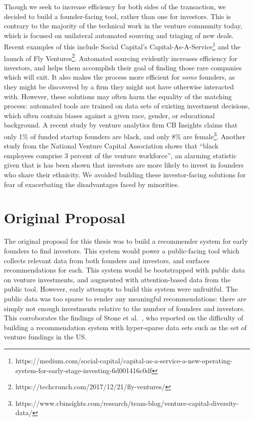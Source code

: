 Though we seek to increase efficiency for both sides of the transaction, we decided to build a founder-facing tool, rather than one for investors. This is contrary to the majority of the technical work in the venture community today, which is focused on unilateral automated sourcing and triaging of new deals. Recent examples of this include Social Capital's Capital-As-A-Service\footnote{https://medium.com/social-capital/capital-as-a-service-a-new-operating-system-for-early-stage-investing-6d001416c0df} and the launch of Fly Ventures\footnote{https://techcrunch.com/2017/12/21/fly-ventures/}. Automated sourcing evidently increases efficiency for investors, and helps them accomplish their goal of finding those rare companies which will exit. It also makes the process more efficient for \textit{some} founders, as they might be discovered by a firm they might not have otherwise interacted with. However, these solutions may often harm the equality of the matching process: automated tools are trained on data sets of existing investment decisions, which often contain biases against a given race, gender, or educational background. A recent study by venture analytics firm CB Insights claims that only 1\% of funded startup founders are black, and only 8\% are female\footnote{https://www.cbinsights.com/research/team-blog/venture-capital-diversity-data/}. Another study from the National Venture Capital Association shows that ``black employees comprise 3 percent of the venture workforce''\cite{nvca-diversity}, an alarming statistic given that is has been shown that investors are more likely to invest in founders who share their ethnicity\cite{BENGTSSON2015338}. We avoided building these investor-facing solutions for fear of exacerbating the disadvantages faced by minorities.

\section{Original Proposal}

The original proposal for this thesis was to build a recommender system for early founders to find investors. This system would power a public-facing tool which collects relevant data from both founders and investors, and surfaces recommendations for each. This system would be bootstrapped with public data on venture investments, and augmented with attention-based data from the public tool. However, early attempts to build this system were unfruitful. The public data was too sparse to render any meaningful recommendations: there are simply not enough investments relative to the number of founders and investors. This corroborates the findings of Stone et al.~\cite{Stone:2013:EST:2541167.2507882}, who reported on the difficulty of building a recommendation system with hyper-sparse data sets such as the set of venture fundings in the US.

